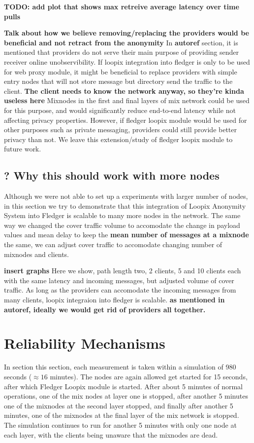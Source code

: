 \documentclass[a4paper,11pt,oneside]{report}
\begin{document}
\textbf{TODO: add plot that shows max retreive average latency over time pulls}

\textbf{Talk about how we believe removing/replacing the providers would be beneficial and not retract from the anonymity}
In \textbf{autoref} section, it is mentioned that providers do not serve their main purpose of providing sender receiver online unobservibility. If loopix integration into fledger is only to be used for web proxy module, it might be beneficial to replace providers with simple entry nodes that will not store message but directory send the traffic to the client. \textbf{The client needs to know the network anyway, so they're kinda useless here} Mixnodes in the first and final layers of mix network could be used for this purpose, and would significantly reduce end-to-end latency while not affecting privacy properties. However, if fledger loopix module would be used for other purposes such as private messaging, providers could still provide better privacy than not. We leave this extension/study of fledger loopix module to future work.

\subsection{? Why this should work with more nodes}
Although we were not able to set up a experiments with larger number of nodes, in this section we try to demonstrate that this integration of Loopix Anonymity System into Fledger is scalable to many more nodes in the network. The same way we changed the cover traffic volume to accomodate the change in payload values and mean delay to keep the \textbf{mean number of messages at a mixnode} the same, we can adjust cover traffic to accomodate changing number of mixnodes and clients.

\textbf{insert graphs}
Here we show, path length two, 2 clients, 5 and 10 clients each with the same latency and incoming messages, but adjusted volume of cover traffic. As long as the providers can accomodate the incoming messages from many clients, loopix integraion into fledger is scalable. \textbf{as mentioned in autoref, ideally we would get rid of providers all together.}

\section{Reliability Mechanisms}
In section this section, each measurement is taken within a simulation of 980 seconds  (\(\approx 16\) minutes). The nodes are again allowed get started for 15 seconds, after which Fledger Loopix module is started. After about 5 minutes of normal operations, one of the mix nodes at layer one is stopped, after another 5 minutes one of the mixnodes at the second layer stopped, and finally after another 5 minutes, one of the mixnodes at the final layer of the mix network is stopped. The simulation continues to run for another 5 minutes with only one node at each layer, with the clients being unaware that the mixnodes are dead. 
\end{document}
